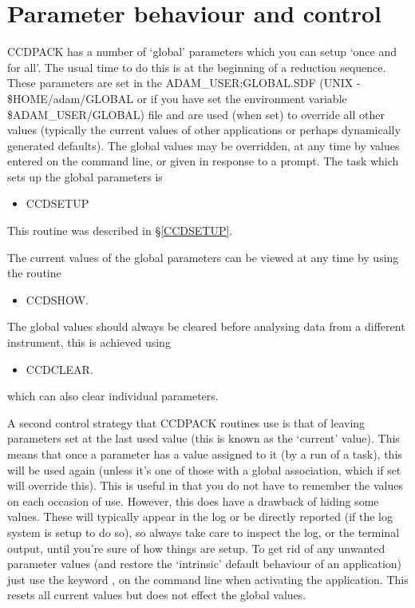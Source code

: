 \clearpage

\section{Parameter behaviour and control}

CCDPACK has a number of `global' parameters which you can setup
`once and for all'. The usual time to do this is at the beginning of a
reduction sequence. These parameters are set in the
ADAM\_USER:GLOBAL.SDF (UNIX - \$HOME/adam/GLOBAL or if you have set 
the environment variable \$ADAM\_USER/GLOBAL)
file and are used (when set) to override all other values (typically the
current values of other applications or perhaps  dynamically generated
defaults). The global values may be overridden, at any time by values
entered on the command line, or given in response to a prompt. The task
which sets up the global parameters is 

\begin{itemize}
\item CCDSETUP
\end{itemize}

This routine was described in \S\ref{CCDSETUP}.

The current values of the global parameters can be viewed at any time by
using the routine 

\begin{itemize}
\item CCDSHOW.
\end{itemize}

The global values should always be cleared before analysing data from a
different instrument, this is achieved using 

\begin{itemize}
\item CCDCLEAR.
\end{itemize}

which can also clear individual parameters.

A second control strategy that CCDPACK routines use is that of leaving
parameters set at the last used value (this is known as the `current'
value). This means that once a parameter has a value assigned to it (by
a run of a task), this will be used again (unless it's one of those
with a global association, which if set will override this). This is
useful in that you do not have to remember the values on each occasion
of use. However, this does have a drawback of hiding some values. These
will typically appear in the log or be directly reported (if the log
system is setup to do so), so always take care to inspect the log, or
the terminal output, until you're sure of how things are setup. To get
rid of any unwanted parameter values (and restore the `intrinsic'
default behaviour of an application) just use the keyword 
, on the
command line when activating the application. This resets all current
values but does not effect the global values.

